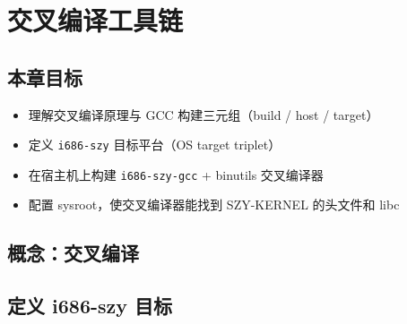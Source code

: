 \chapter{交叉编译工具链}
\label{ch:cross-toolchain}

\section{本章目标}

\begin{itemize}
  \item 理解交叉编译原理与 GCC 构建三元组（build / host / target）
  \item 定义 \texttt{i686-szy} 目标平台（OS target triplet）
  \item 在宿主机上构建 \texttt{i686-szy-gcc} + binutils 交叉编译器
  \item 配置 sysroot，使交叉编译器能找到 SZY-KERNEL 的头文件和 libc
\end{itemize}

\section{概念：交叉编译}
\label{sec:cross-concept}


\section{定义 i686-szy 目标}
\label{sec:cross-target}

